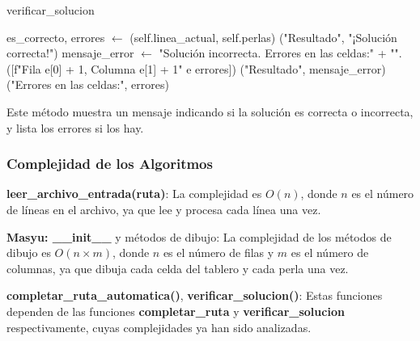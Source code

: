 \documentclass{article}
\begin{document}
\begin{algorithm}[H]
\caption{verificar\_solucion}
\begin{algorithmic}[1]
    \State es\_correcto, errores $\leftarrow$ (self.linea\_actual, self.perlas)
        \State {}("Resultado", "¡Solución correcta!")
    \Else
        \State mensaje\_error $\leftarrow$ "Solución incorrecta. Errores en las celdas:\n" + "\n".([f"Fila {e[0] + 1}, Columna {e[1] + 1}"  e  errores])
        \State {}("Resultado", mensaje\_error)
        \State {}("Errores en las celdas:", errores)
    \EndIf
\EndProcedure
\end{algorithmic}
\end{algorithm}

Este método muestra un mensaje indicando si la solución es correcta o incorrecta, y lista los errores si los hay.

\subsubsection{Complejidad de los Algoritmos}

\textbf{leer\_archivo\_entrada(ruta)}: La complejidad es \(O(n)\), donde \(n\) es el número de líneas en el archivo, ya que lee y procesa cada línea una vez.

\textbf{Masyu: \_\_init\_\_} y métodos de dibujo: La complejidad de los métodos de dibujo es \(O(n \times m)\), donde \(n\) es el número de filas y \(m\) es el número de columnas, ya que dibuja cada celda del tablero y cada perla una vez.

\textbf{completar\_ruta\_automatica()}, \textbf{verificar\_solucion()}: Estas funciones dependen de las funciones \textbf{completar\_ruta} y \textbf{verificar\_solucion} respectivamente, cuyas complejidades ya han sido analizadas.
\end{document}
